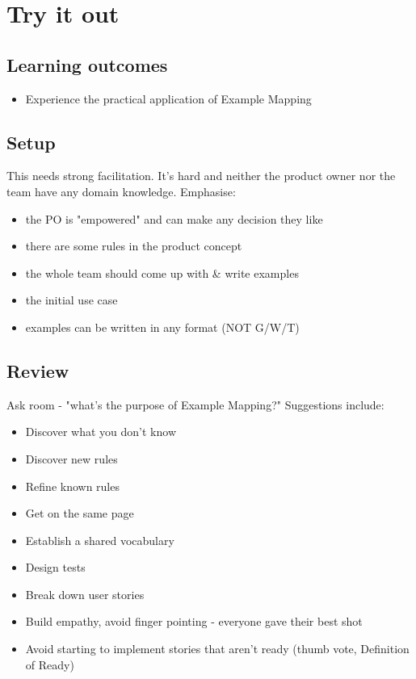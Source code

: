 \fi 


\chapter*{Try it out}

\ifnotes

    \section*{Learning outcomes}
    
    \begin{itemize}
        \item Experience the practical application of Example Mapping

    \end{itemize}
    
    
    \section*{Setup}

    This needs strong facilitation. It's hard and neither the product owner nor the team have any domain knowledge. Emphasise:
    
    \begin{itemize}
        \item the PO is "empowered" and can make any decision they like
        \item there are some rules in the product concept
        \item the whole team should come up with \& write examples
        \item the initial use case
        \item examples can be written in any format (NOT G/W/T)
    \end{itemize}   
    
    
    \section*{Review}
    
    Ask room - "what's the purpose of Example Mapping?" Suggestions include:
    
    \begin{itemize}
        \item Discover what you don't know
        \item Discover new rules
        \item Refine known rules
        \item Get on the same page
        \item Establish a shared vocabulary
        \item Design tests
        \item Break down user stories
        \item Build empathy, avoid finger pointing - everyone gave their best shot
        \item Avoid starting to implement stories that aren't ready (thumb vote, Definition of Ready)
    \end{itemize}

